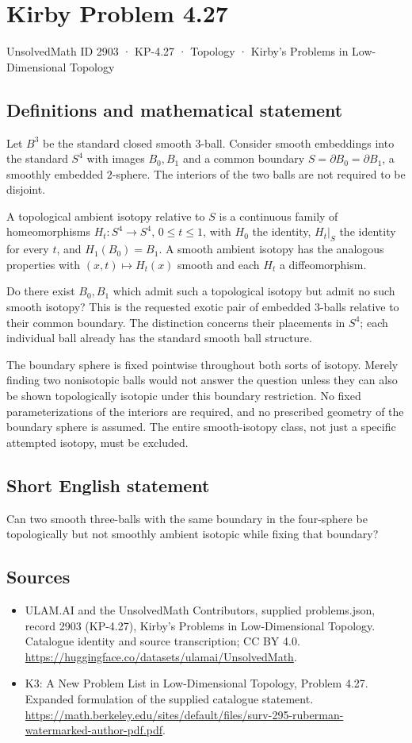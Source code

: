 \documentclass[11pt,a4paper]{article}
\begin{document}
\section*{Kirby Problem 4.27}\label{2903}
{\small UnsolvedMath ID 2903 · KP-4.27 · Topology · Kirby's Problems in Low-Dimensional Topology}
\subsection{Definitions and mathematical statement}
Let $B^3$ be the standard closed smooth $3$-ball. Consider smooth
embeddings into the standard $S^4$ with images $B_0,B_1$ and a
common boundary $S=\partial B_0=\partial B_1$, a smoothly embedded
$2$-sphere. The interiors of the two balls are not required to be
disjoint.

A topological ambient isotopy relative to $S$ is a continuous family
of homeomorphisms $H_t:S^4\to S^4$, $0\le t\le1$, with $H_0$
the identity, $H_t|_S$ the identity for every $t$, and $H_1(B_0)=B_1$.
A smooth ambient isotopy has the analogous properties with $(x,t)
\mapsto H_t(x)$ smooth and each $H_t$ a diffeomorphism.

Do there exist $B_0,B_1$ which admit such a topological isotopy but
admit no such smooth isotopy? This is the requested exotic pair of
embedded $3$-balls relative to their common boundary. The distinction
concerns their placements in $S^4$; each individual ball already has
the standard smooth ball structure.

The boundary sphere is fixed pointwise throughout both sorts of
isotopy. Merely finding two nonisotopic balls would not answer the
question unless they can also be shown topologically isotopic under
this boundary restriction. No fixed parameterizations of the interiors
are required, and no prescribed geometry of the boundary sphere is
assumed. The entire smooth-isotopy class, not just a specific attempted
isotopy, must be excluded.
\subsection{Short English statement}
Can two smooth three-balls with the same boundary in the four-sphere be topologically but not smoothly ambient isotopic while fixing that boundary?
\subsection{Sources}
\begin{itemize}
\item[S1] ULAM.AI and the UnsolvedMath Contributors, supplied problems.json, record 2903 (KP-4.27), Kirby's Problems in Low-Dimensional Topology. Catalogue identity and source transcription; CC BY 4.0.
\url{https://huggingface.co/datasets/ulamai/UnsolvedMath}.
\item[S2] K3: A New Problem List in Low-Dimensional Topology, Problem 4.27. Expanded formulation of the supplied catalogue statement.
\url{https://math.berkeley.edu/sites/default/files/surv-295-ruberman-watermarked-author-pdf.pdf}.
\end{itemize}
\end{document}
